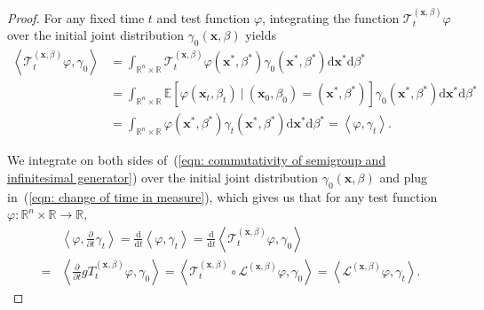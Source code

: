 \documentclass{article}
\numberwithin{equation}{section}
\def\eqref#1{(\ref{#1})}
\newcommand{\dif}{{\mathrm{d}}}
\def\vx{{\bm{x}}}
\def\gT{{\mathcal{T}}}
\newcommand{\Ls}{\mathcal{L}}
\begin{document}
\begin{proof}
    
    For any fixed time $t$ and test function $\varphi$, integrating the function $\gT^{(\vx,\beta)}_{t}\varphi$ over the initial joint distribution $\gamma_{0}(\vx,\beta)$ yields
    \begin{equation}
    \label{eqn: change of time in measure}
    \begin{aligned}
    \left\langle \gT^{(\vx,\beta)}_{t}\varphi,\gamma_0\right\rangle &= \int_{\mathbb{R}^n \times \mathbb{R}}\gT^{(\vx,\beta)}_{t}\varphi(\vx^\ast,\beta^\ast)\gamma_{0}\left(\vx^\ast,\beta^\ast\right)\dif\vx^\ast\dif\beta^\ast\\
    &= \int_{\mathbb{R}^n \times \mathbb{R}} \mathbb{E}\left[\varphi(\vx_t,\beta_t) \ | \ (\vx_0,\beta_0) = (\vx^\ast, \beta^\ast)\right]\gamma_{0}\left(\vx^\ast,\beta^\ast\right)\dif\vx^\ast\dif\beta^\ast\\
    &= \int_{\mathbb{R}^n \times \mathbb{R}}\varphi(\vx^\ast,\beta^\ast)\gamma_{t}(\vx^\ast,\beta^\ast)\dif\vx^\ast\dif\beta^\ast = \left\langle\varphi, \gamma_t\right\rangle.
    \end{aligned}    
    \end{equation}

    We integrate on both sides of~\eqref{eqn: commutativity of semigroup and infinitesimal generator} over the initial joint distribution $\gamma_{0}(\vx,\beta)$ and plug in~\eqref{eqn: change of time in measure}, which gives us that for any test function $\varphi:\mathbb{R}^n \times \mathbb{R} \rightarrow \mathbb{R}$,
    \begin{equation}
    \label{eqn: intermediate derivaion of weak form for joint PDE}
    \begin{aligned}
    &\left\langle\varphi, \frac{\partial}{\partial t}\gamma_t\right\rangle = \frac{\dif}{\dif t}\left\langle\varphi,\gamma_t\right\rangle = \frac{\dif}{\dif t}\left\langle\gT^{(\vx,\beta)}_{t}\varphi, \gamma_0\right\rangle \\
    =& \left\langle\frac{\partial}{\partial t}gT^{(\vx,\beta)}_{t}\varphi, \gamma_0\right\rangle 
    = \left\langle\gT^{(\vx,\beta)}_{t}\circ\Ls^{(\vx,\beta)}\varphi, \gamma_0\right\rangle 
    = \left\langle\Ls^{(\vx,\beta)}\varphi, \gamma_t\right\rangle.  
    \end{aligned}    
    \end{equation}


\end{proof}
\end{document}

